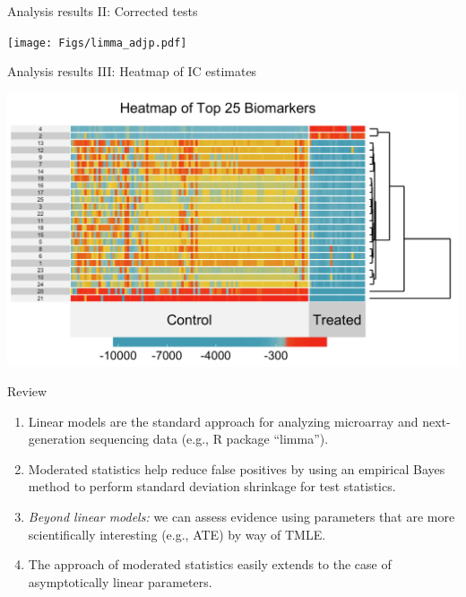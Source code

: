 \documentclass[12pt,t]{beamer}
\begin{document}
\begin{frame}[c]{Analysis results II: Corrected tests}

\begin{center}
  \texttt{[image: Figs/limma\_adjp.pdf]}
\end{center}

\end{frame}



\begin{frame}[c]{Analysis results III: Heatmap of IC estimates}

\begin{center}
  \includegraphics[scale=0.45]{Figs/superheatmap.png}
\end{center}

\end{frame}



\begin{frame}[c]{Review}
\begin{center}
\begin{enumerate}
  \itemsep12pt
  \item Linear models are the standard approach for analyzing microarray and
    next-generation sequencing data (e.g., R package ``limma'').
  \item Moderated statistics help reduce false positives by using an empirical
    Bayes method to perform standard deviation shrinkage for test statistics.
  \item \textit{Beyond linear models:} we can assess evidence using parameters
    that are more scientifically interesting (e.g., ATE) by way of TMLE.
  \item The approach of moderated statistics easily extends to the case of
    asymptotically linear parameters.
\end{enumerate}
\end{center}


\end{frame}
\end{document}
